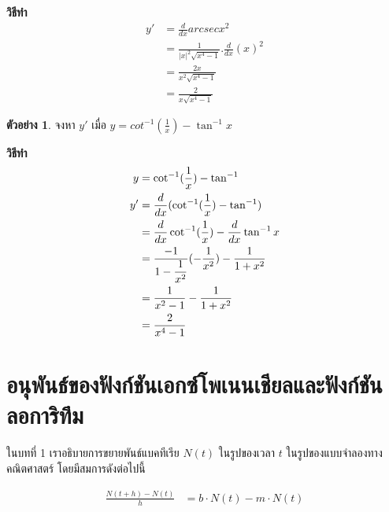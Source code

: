 \documentclass[
]{book}
\theoremstyle{definition}
\theoremstyle{definition}
\newtheorem{example}{ตัวอย่าง}[chapter]
\theoremstyle{definition}
\theoremstyle{definition}
\theoremstyle{remark}
\begin{document}
\textbf{วิธีทำ} \begin{equation}   \begin{aligned}
 \displaystyle y'&=\frac{d}{dx}arcsec
x^{2}\\
&=\displaystyle \frac{1}{|x|^{2}\sqrt{x^{4}-1}}.\frac{d}{dx}(x)^{2}\\
&=\displaystyle \frac{2x}{x^{2}\sqrt{x^{4}-1}}\\
&=\displaystyle \frac{2}{x\sqrt{x^{4}-1}}
  \end{aligned} \end{equation}

\begin{example}
จงหา \(y'\) เมื่อ \(y=cot^{-1}\displaystyle(\frac{1}{x})-\tan^{-1}x\)
\end{example}

\textbf{วิธีทำ} \begin{equation}   \begin{aligned}
\displaystyle y&=\cot^{-1}(\frac{1}{x})-\tan^{-1}\\
\displaystyle y'&=\frac{d}{dx}(\cot^{-1}(\frac{1}{x})-\tan^{-1})\\
\displaystyle &=\frac{d}{dx}\cot^{-1}(\displaystyle
\frac{1}{x})-\frac{d}{dx}\tan^{-1}x\\
\displaystyle &=\frac{-1}{1-\displaystyle
\frac{1}{x^{2}}}(-\frac{1}{x^{2}})-\frac{1}{1+x^{2}}\\
\displaystyle &=\frac{1}{x^{2}-1}-\frac{1}{1+x^{2}}\\
\displaystyle &=\frac{2}{x^{4}-1}
  \end{aligned} \end{equation}

\section{อนุพันธ์ของฟังก์ชันเอกซ์โพเนนเชียลและฟังก์ชันลอการิทึม}\label{uxe2duxe19uxe1euxe19uxe18uxe02uxe2duxe07uxe1fuxe07uxe01uxe0auxe19uxe40uxe2duxe01uxe0buxe42uxe1euxe40uxe19uxe19uxe40uxe0auxe22uxe25uxe41uxe25uxe30uxe1fuxe07uxe01uxe0auxe19uxe25uxe2duxe01uxe32uxe23uxe17uxe21}

ในบทที่ 1 เราอธิบายการขยายพันธ์แบคทีเรีย \(N(t)\) ในรูปของเวลา \(t\)
ในรูปของแบบจำลองทางคณิตศาสตร์ โดยมีสมการดังต่อไปนี้

\begin{align}
\frac{N(t + h) - N(t)}{h} &= b\cdot N(t)  - m\cdot N(t)\\
\label{eq:population-growth-chapter3}
\end{align}
\end{document}
